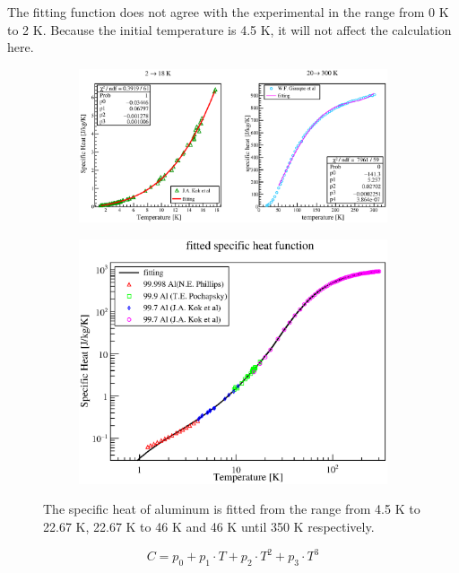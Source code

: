 The fitting function does not agree with the experimental in the range from 0 K to 2 K.
Because the initial temperature is 4.5 K, it will not affect the calculation here.
  \begin{figure}[H]
   \begin{subfigure}{0.3\textwidth}
    \centering
	\includegraphics[scale=0.43]{chapter5/fig/alspheat.eps}
   \end{subfigure}
   \hspace{0.2\textwidth}
   \begin{subfigure}{0.3\textwidth}
    \centering
	\includegraphics[scale=0.43]{chapter5/fig/alspheat2.eps}
   \end{subfigure}
   \caption{The specific heat of aluminum is fitted from the range from 4.5 K to 22.67 K, 22.67 K to 46 K and 46 K until 350 K respectively.}
   \label{4alsh2}
  \end{figure}
\begin{equation}
 C = p_0 + p_1 \cdot T + p_2 \cdot T^2 + p_3 \cdot T^3
\end{equation}
